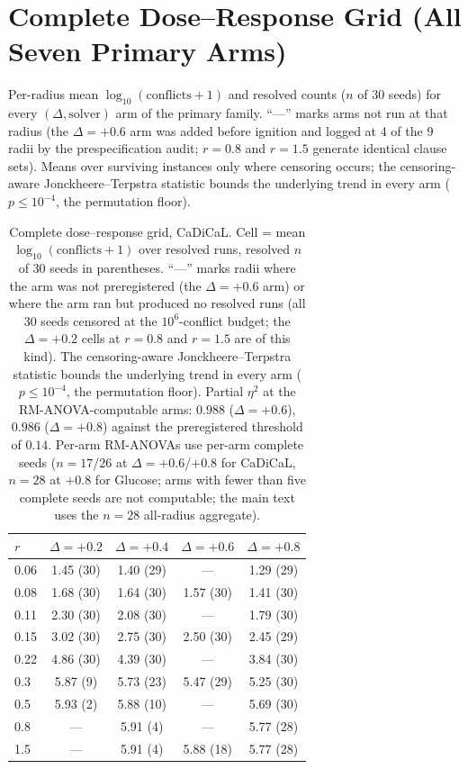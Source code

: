 \documentclass[manuscript, screen, review]{jair}
\begin{document}
\section{Complete Dose--Response Grid (All Seven Primary Arms)}
\label{app:e3atable}

Per-radius mean $\log_{10}(\text{conflicts}+1)$ and resolved counts
($n$ of 30 seeds) for every $(\Delta, \text{solver})$ arm of the primary
family. ``---'' marks arms not run at that radius (the $\Delta{=}{+}0.6$ arm
was added before ignition and logged at 4 of the 9 radii by the
prespecification audit; $r{=}0.8$ and $r{=}1.5$ generate
identical clause sets). Means over surviving instances only where censoring
occurs; the censoring-aware Jonckheere--Terpstra statistic bounds the
underlying trend in every arm ($p\le10^{-4}$, the permutation floor).

\begin{table}[h]
\centering
\caption{Complete dose--response grid, CaDiCaL. Cell = mean
$\log_{10}(\text{conflicts}+1)$ over resolved runs, resolved $n$ of 30 seeds
in parentheses. ``---'' marks radii where the arm was not preregistered
(the $\Delta{=}{+}0.6$ arm) or where the arm ran but produced no resolved
runs (all 30 seeds censored at the $10^6$-conflict budget; the
$\Delta{=}{+}0.2$ cells at $r{=}0.8$ and $r{=}1.5$ are of this kind). The
censoring-aware Jonckheere--Terpstra statistic bounds the underlying trend in
every arm ($p\le10^{-4}$, the permutation floor). Partial $\eta^2$ at the
RM-ANOVA-computable arms: $0.988$ ($\Delta{=}{+}0.6$), $0.986$
($\Delta{=}{+}0.8$) against the preregistered threshold of $0.14$. Per-arm
RM-ANOVAs use per-arm complete seeds ($n{=}17$/$26$ at $\Delta{=}{+}0.6$/$
+0.8$ for CaDiCaL, $n{=}28$ at $+0.8$ for Glucose; arms with fewer than five
complete seeds are not computable; the main text uses the $n{=}28$
all-radius aggregate).}
\label{tab:e3afull}
\begin{tabular}{lcccc}
\toprule
$r$ & $\Delta{=}{+}0.2$ & $\Delta{=}{+}0.4$ & $\Delta{=}{+}0.6$ & $\Delta{=}{+}0.8$\\
\midrule
0.06 & 1.45 (30) & 1.40 (29) & --- & 1.29 (29)\\
0.08 & 1.68 (30) & 1.64 (30) & 1.57 (30) & 1.41 (30)\\
0.11 & 2.30 (30) & 2.08 (30) & --- & 1.79 (30)\\
0.15 & 3.02 (30) & 2.75 (30) & 2.50 (30) & 2.45 (29)\\
0.22 & 4.86 (30) & 4.39 (30) & --- & 3.84 (30)\\
0.3 & 5.87 (9) & 5.73 (23) & 5.47 (29) & 5.25 (30)\\
0.5 & 5.93 (2) & 5.88 (10) & --- & 5.69 (30)\\
0.8 & --- & 5.91 (4) & --- & 5.77 (28)\\
1.5 & --- & 5.91 (4) & 5.88 (18) & 5.77 (28)\\
\bottomrule
\end{tabular}
\end{table}
\end{document}

